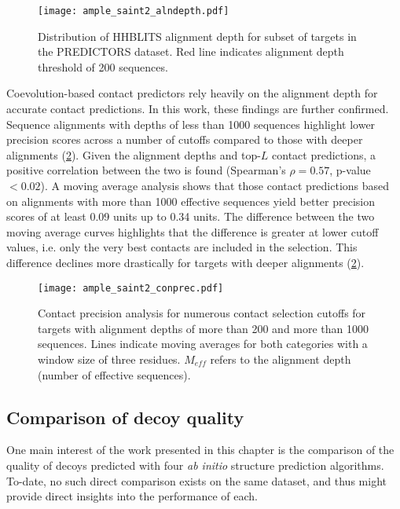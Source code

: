 \begin{figure}[H]
    \centering
    \texttt{[image: ample\_saint2\_alndepth.pdf]}
    \caption[Distribution of alignment depth for subset of targets in the PREDICTORS dataset.]{Distribution of HHBLITS alignment depth for subset of targets in the PREDICTORS dataset. Red line indicates alignment depth threshold of 200 sequences.}
    \label{fig:ample_saint2_alndepth}
\end{figure}

Coevolution-based contact predictors rely heavily on the alignment depth for accurate contact predictions. In this work, these findings are further confirmed. Sequence alignments with depths of less than 1000 sequences highlight lower precision scores across a number of cutoffs compared to those with deeper alignments (\cref{fig:ample_saint2_conprec}). Given the alignment depths and top-$L$ contact predictions, a positive correlation between the two is found (Spearman's $\rho=0.57$, p-value $<0.02$). A moving average analysis shows that those contact predictions based on alignments with more than 1000 effective sequences yield better precision scores of at least 0.09 units up to 0.34 units. The difference between the two moving average curves highlights that the difference is greater at lower cutoff values, i.e. only the very best contacts are included in the selection. This difference declines more drastically for targets with deeper alignments (\cref{fig:ample_saint2_conprec}).

\begin{figure}[H]
    \centering
    \texttt{[image: ample\_saint2\_conprec.pdf]}
    \caption[Contact predicion analysis for numerous contact selection cutoffs]{Contact precision analysis for numerous contact selection cutoffs for targets with alignment depths of more than 200 and more than 1000 sequences. Lines indicate moving averages for both categories with a window size of three residues. $M_{eff}$ refers to the alignment depth (number of effective sequences).}
    \label{fig:ample_saint2_conprec}
\end{figure}

\subsection{Comparison of decoy quality}
One main interest of the work presented in this chapter is the comparison of the quality of decoys predicted with four \textit{ab initio} structure prediction algorithms. To-date, no such direct comparison exists on the same dataset, and thus might provide direct insights into the performance of each.

